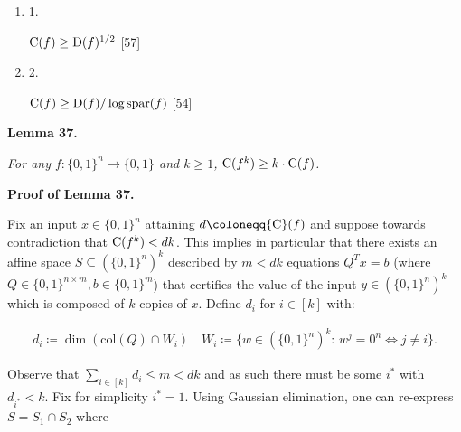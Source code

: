 \documentclass[10pt,a4paper]{article}
\begin{document}
\begin{enumerate}


\item[] 
1. 


${\textup{C}}(f)\geq{\textup{D}}(f)^{1/2}$ [57]\par





\item[] 
2. 


${\textup{C}}(f)\geq{\textup{D}}(f)/\log\mathrm{spar}(f)$ [54]\par





\end{enumerate}





\par\medskip\noindent\textbf{
\textbf{Lemma 37}\textbf{.}
}\par



\emph{For any $f\colon\{0,1\}^{n}\to\{0,1\}$ and $k\geq 1$, ${\textup{C}}(f^{k})\geq k\cdot{\textup{C}}(f)$.}\par






\par\medskip\noindent\textbf{Proof of Lemma 37.}\par




Fix an input $x\in\{0,1\}^{n}$ attaining $d\coloneqq{\textup{C}}(f)$ and suppose towards contradiction that ${\textup{C}}(f^{k})<dk$. This implies in particular that there exists an affine space $S\subseteq(\{0,1\}^{n})^{k}$ described by $m<dk$ equations $Q^{T}x=b$ (where $Q\in\{0,1\}^{n\times m},b\in\{0,1\}^{m}$) that certifies the value of the input $y\in(\{0,1\}^{n})^{k}$ which is composed of $k$ copies of $x$. Define $d_{i}$ for $i\in[k]$ with:\par


\[\begin{gathered}
d_{i}\coloneqq\dim(\mathrm{col}(Q)\cap W_{i})\quad W_{i}\coloneqq\{w\in(\{0,1\}^{n})^{k}:\,w^{j}=0^{n}\iff j\neq i\}.
\end{gathered}\]


Observe that $\sum_{i\in[k]}d_{i}\leq m<dk$ and as such there must be some $i^{*}$ with $d_{i^{*}}<k$. Fix for simplicity $i^{*}=1$. Using Gaussian elimination, one can re-express $S=S_{1}\cap S_{2}$ where\par
\end{document}
